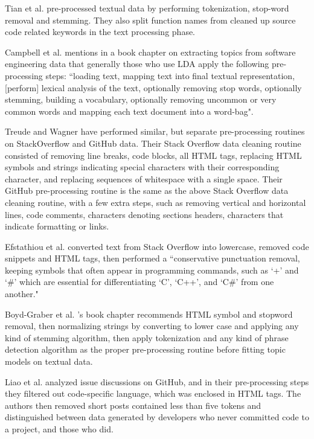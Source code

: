     Tian et al. \cite{tian2013predicting} pre-processed textual data by performing tokenization, stop-word removal and stemming. They also split function names from cleaned up source code related keywords in the text processing phase.
    
    Campbell et al. \cite{campbell2015latent} mentions in a book chapter on extracting topics from software engineering data that generally those who use LDA apply the following pre-processing steps: ``loading text, mapping text into final textual representation, [perform] lexical analysis of the text, optionally removing stop words, optionally stemming, building a vocabulary, optionally removing uncommon or very common words and mapping each text document into a word-bag".
    
    Treude and Wagner \cite{treude2019predicting} have performed similar, but separate pre-processing routines on StackOverflow and GitHub data. Their Stack Overflow data cleaning routine consisted of removing line breaks, code blocks, all HTML tags, replacing HTML symbols and strings indicating special characters with their corresponding character, and replacing sequences of whitespace with a single space. Their GitHub pre-processing routine is the same as the above Stack Overflow data cleaning routine, with a few extra steps, such as removing vertical and horizontal lines, code comments, characters denoting sections headers, characters that indicate formatting or links. 
    
    Efstathiou et al. \cite{efstathiou2018word} converted text from Stack Overflow into lowercase, removed code snippets and HTML tags, then performed a ``conservative punctuation removal, keeping symbols that often appear in programming commands, such as ‘+’ and ‘\#’ which are essential for differentiating ‘C’, ‘C++’, and ‘C\#’ from one another."
    
    Boyd-Graber et al. \cite{boyd2014care}'s book chapter recommends HTML symbol and  stopword removal, then normalizing strings by converting to lower case and applying any kind of stemming algorithm, then apply tokenization and any kind of phrase detection algorithm as the proper pre-processing routine before fitting topic models on textual data.
    
    Liao et al. \cite{liao2019status} analyzed issue discussions on GitHub, and in their pre-processing steps they filtered out code-specific language, which was enclosed in HTML tags. The authors then removed short posts contained less than five tokens and distinguished between data generated by developers who never committed code to a project, and those who did. 
    
